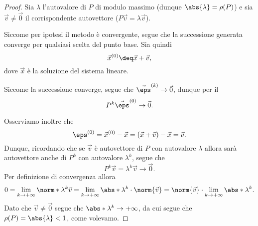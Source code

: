 \begin{proof}
    Sia $\lambda$ l'autovalore di $P$ di modulo massimo (dunque $\abs{\lambda} = \rho(P)$) e sia $\vec v \neq \vec 0$ il corrispondente autovettore ($P\vec v = \lambda\vec v$).

    Siccome per ipotesi il metodo è convergente, segue che la successione generata converge per qualsiasi scelta del punto base. Sia quindi \[
        \vec x^{(0)} \deq \vec x + \vec v,
    \] dove $\vec x$ è la soluzione del sistema lineare.

    Siccome la successione converge, segue che $\vec \eps^{(k)} \to \vec 0$, dunque per il  \[
        P^k \vec \eps^{(0)} \to \vec 0.
    \]
    
    Osserviamo inoltre che \[
        \eps^{(0)} = \vec x^{(0)} - \vec x = (\vec x + \vec v) - \vec x = \vec v.
    \] Dunque, ricordando che se $\vec v$ è autovettore di $P$ con autovalore $\lambda$ allora sarà autovettore anche di $P^k$ con autovalore $\lambda^k$, segue che \[
        P^k \vec v = \lambda^k\vec v \to \vec 0. 
    \] Per definizione di convergenza allora \[
        0 
        = \lim_{k \to +\infty} \norm*{\lambda^k\vec v}
        = \lim_{k \to +\infty} \abs*{\lambda^k} \cdot \norm{\vec v} 
        = \norm{\vec v} \cdot \lim_{k \to +\infty} \abs*{\lambda}^k.
    \] Dato che $\vec v \neq \vec 0$ segue che $\abs*{\lambda}^k \to +\infty$, da cui segue che $\rho(P) = \abs{\lambda} < 1$, come volevamo.
\end{proof}